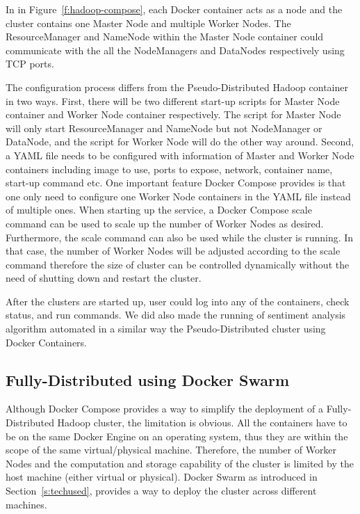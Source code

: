 In in Figure~\ref{f:hadoop-compose}, each Docker container acts as a node 
and the cluster contains one Master Node and 
multiple Worker Nodes. The ResourceManager and NameNode within the 
Master Node container could communicate with the all the NodeManagers 
and DataNodes respectively using TCP ports. 

The configuration process differs from the Pseudo-Distributed Hadoop 
container in two ways. First, there will be two different start-up scripts for 
Master Node container and Worker Node container respectively. The script 
for Master Node will only start ResourceManager and NameNode but not 
NodeManager or DataNode, and the script for Worker Node will do the other 
way around. Second, a YAML file needs to be configured with information of 
Master and Worker Node containers including image to use, ports to expose, 
network, container name, start-up command etc. One important feature 
Docker Compose provides is that one only need to configure one Worker 
Node containers in the YAML file instead of multiple ones. When starting up 
the service, a Docker Compose scale command can be used to scale up the 
number of Worker Nodes as desired. Furthermore, the scale command can 
also be used while the cluster is running. In that case, the number of Worker 
Nodes will be adjusted according to the scale command therefore the size of 
cluster can be controlled dynamically without the need of shutting down and 
restart the cluster. 

After the clusters are started up, user could log into any of the containers, 
check status, and run commands. We did also made the running of 
sentiment analysis algorithm automated in a similar way the 
Pseudo-Distributed cluster using Docker Containers.


\subsection{Fully-Distributed using Docker Swarm}

Although Docker Compose provides a way to simplify the deployment of a 
Fully-Distributed Hadoop cluster, the limitation is obvious. All the containers 
have to be on the same Docker Engine on an operating system, thus they are 
within the scope of the same virtual/physical machine. Therefore, the number 
of Worker Nodes and the computation and storage capability of the cluster is 
limited by the host machine (either virtual or physical). Docker Swarm as 
introduced in Section~\ref{s:techused}, provides a way to deploy the cluster 
across different machines. 

